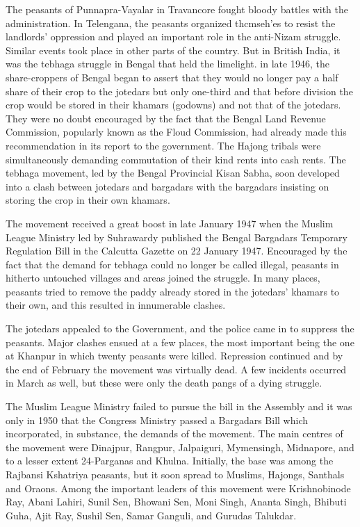 \begin{multicols}{2}
The peasants of Punnapra-Vayalar in Travancore fought bloody battles with the administration. In Telengana, the peasants organized thcmseh'es to resist the landlords' oppression and played an important role in the anti-Nizam struggle. Similar events took place in other parts of the country. But in British India, it was the tebhaga struggle in Bengal that held the limelight. in late 1946, the share-croppers of Bengal began to assert that they would no longer pay a half share of their crop to the jotedars but only one-third and that before division the crop would be stored in their khamars (godowns) and not that of the jotedars. They were no doubt encouraged by the fact that the Bengal Land Revenue Commission, popularly known as the Floud Commission, had already made this recommendation in its report to the government. The Hajong tribals were simultaneously demanding commutation of their kind rents into cash rents. The tebhaga movement, led by the Bengal Provincial Kisan Sabha, soon developed into a clash between jotedars and bargadars with the bargadars insisting on storing the crop in their own khamars.

The movement received a great boost in late January 1947 when the Muslim League Ministry led by Suhrawardy published the Bengal Bargadars Temporary Regulation Bill in the Calcutta Gazette on 22 January 1947. Encouraged by the fact that the demand for tebhaga could no longer be called illegal, peasants in hitherto untouched villages and areas joined the struggle. In many places, peasants tried to remove the paddy already stored in the jotedars' khamars to their own, and this resulted in innumerable clashes.

The jotedars appealed to the Government, and the police came in to suppress the peasants. Major clashes ensued at a few places, the most important being the one at Khanpur in which twenty peasants were killed. Repression continued and by the end of February the movement was virtually dead. A few incidents occurred in March as well, but these were only the death pangs of a dying struggle.

The Muslim League Ministry failed to pursue the bill in the Assembly and it was only in 1950 that the Congress Ministry passed a Bargadars Bill which incorporated, in substance, the demands of the movement. The main centres of the movement were Dinajpur, Rangpur, Jalpaiguri, Mymensingh, Midnapore, and to a lesser extent 24-Parganas and Khulna. Initially, the base was among the Rajbansi Kshatriya peasants, but it soon spread to Muslims, Hajongs, Santhals and Oraons. Among the important leaders of this movement were Krishnobinode Ray, Abani Lahiri, Sunil Sen, Bhowani Sen, Moni Singh, Ananta Singh, Bhibuti Guha, Ajit Ray, Sushil Sen, Samar Ganguli, and Gurudas Talukdar.


\end{multicols}
